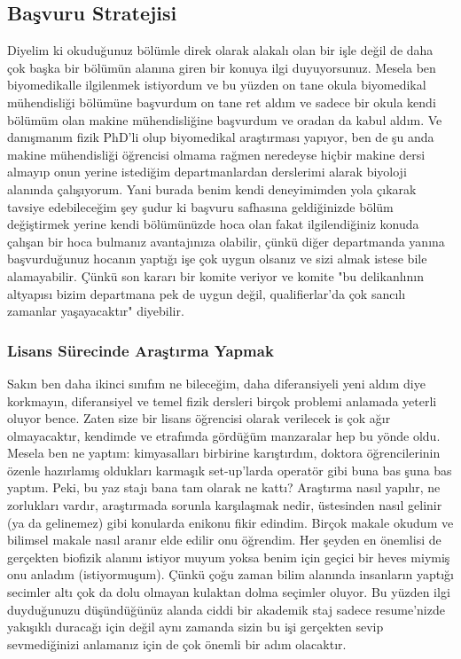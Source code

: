 \documentclass[12pt]{article}
\begin{document}
\subsection{Başvuru Stratejisi}
Diyelim ki okuduğunuz bölümle direk olarak alakalı olan bir işle değil de daha çok başka bir bölümün alanına giren bir konuya ilgi duyuyorsunuz. Mesela ben biyomedikalle ilgilenmek istiyordum ve bu yüzden on tane okula biyomedikal mühendisliği bölümüne başvurdum on tane ret aldım ve sadece bir okula kendi bölümüm olan makine mühendisliğine başvurdum ve oradan da kabul aldım. Ve danışmanım fizik PhD’li olup biyomedikal araştırması yapıyor, ben de şu anda makine mühendisliği öğrencisi olmama rağmen nere\-deyse hiçbir makine dersi almayıp onun yerine istediğim departmanlardan derslerimi alarak biyoloji alanında çalışıyorum. Yani burada benim kendi deneyimimden yola çıkarak tavsiye edebileceğim şey şudur ki başvuru safha\-sına geldiğinizde bölüm değiştirmek yerine kendi bölümünüzde hoca olan fakat ilgilendiğiniz konuda çalışan bir hoca bulmanız avantajınıza olabilir, çünkü diğer departmanda yanına başvurduğunuz hocanın yaptığı işe çok uygun olsanız ve sizi almak istese bile alamayabilir. Çünkü son kararı bir komite veriyor ve komite "bu delikanlının altyapısı bizim departmana pek de uygun değil, qualifierlar’da çok sancılı zamanlar yaşayacaktır" diyebilir.

\subsubsection{Lisans Sürecinde Araştırma Yapmak}
Sakın ben daha ikinci sınıfım ne bileceğim, daha diferansiyeli yeni aldım diye korkmayın, diferansiyel ve temel fizik dersleri birçok problemi anlamada yeterli oluyor bence. Zaten size bir lisans öğrencisi olarak verilecek is çok ağır olmayacaktır, kendimde ve etrafımda gördüğüm manzaralar hep bu yönde oldu. Mesela ben ne yaptım: kimyasalları birbirine karıştırdım, doktora öğrencilerinin özenle hazırlamış oldukları karmaşık set-up’larda operatör gibi buna bas şuna bas yaptım. Peki, bu yaz stajı bana tam olarak ne kattı? Araştırma nasıl yapılır, ne zorlukları vardır, araştırmada sorunla karşılaşmak nedir, üstesinden nasıl gelinir (ya da gelinemez) gibi konularda enikonu fikir edindim. Birçok makale okudum ve bilimsel makale nasıl aranır elde edilir onu öğrendim. Her şeyden en önemlisi de gerçekten biofizik alanını istiyor muyum yoksa benim için geçici bir heves miymiş onu anladım (istiyormuşum). Çünkü çoğu zaman bilim alanında insanların yaptığı secimler altı çok da dolu olmayan kulaktan dolma seçimler oluyor. Bu yüzden ilgi duyduğunuzu düşündüğünüz alanda ciddi bir akademik staj sadece resume'nizde yakışıklı duracağı için değil aynı zamanda sizin bu işi gerçekten sevip sevmediğinizi anlamanız için de çok önemli bir adım olacaktır.
\end{document}
